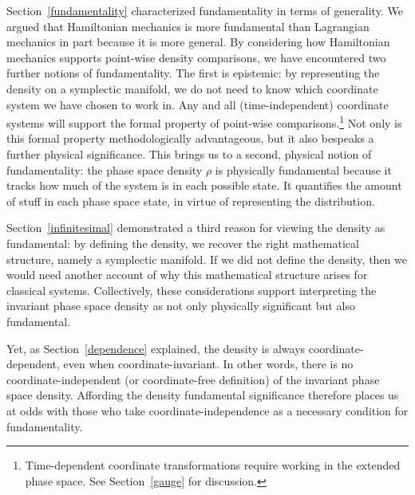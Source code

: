 \documentclass[letterpaper]{article}
\begin{document}

Section~\ref{fundamentality} characterized fundamentality in terms of generality. We argued that Hamiltonian mechanics is more fundamental than Lagrangian mechanics in part because it is more general. By considering how Hamiltonian mechanics supports point-wise density comparisons, we have encountered two further notions of fundamentality. The first is epistemic: by representing the density on a symplectic manifold, we do not need to know which coordinate system we have chosen to work in. Any and all (time-independent) coordinate systems will support the formal property of point-wise comparisons.\footnote{Time-dependent coordinate transformations require working in the extended phase space. See Section~\ref{gauge} for discussion.} Not only is this formal property methodologically advantageous, but it also bespeaks a further physical significance. This brings us to a second, physical notion of fundamentality: the phase space density $\rho$ is physically fundamental because it tracks how much of the system is in each possible state. It quantifies the amount of stuff in each phase space state, in virtue of representing the distribution. 

Section~\ref{infinitesimal} demonstrated a third reason for viewing the density as fundamental: by defining the density, we recover the right mathematical structure, namely a symplectic manifold. If we did not define the density, then we would need another account of why this mathematical structure arises for classical systems. Collectively, these considerations support interpreting the invariant phase space density as not only physically significant but also fundamental. 

Yet, as Section~\ref{dependence} explained, the density is always coordinate-dependent, even when coordinate-invariant. In other words, there is no coordinate-independent (or coordinate-free definition) of the invariant phase space density. Affording the density fundamental significance therefore places us at odds with those who take coordinate-independence as a necessary condition for fundamentality. 
\end{document}
